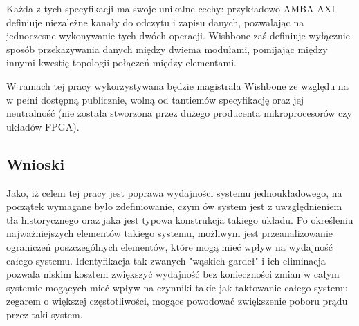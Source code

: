 Każda z tych specyfikacji ma swoje unikalne cechy: przykładowo AMBA AXI definiuje niezależne kanały do odczytu i zapisu danych, pozwalając na jednoczesne wykonywanie tych dwóch operacji. Wishbone zaś definiuje wyłącznie sposób przekazywania danych między dwiema modułami, pomijając między innymi kwestię topologii połączeń między elementami.

W ramach tej pracy wykorzystywana będzie magistrala Wishbone ze względu na w pełni dostępną publicznie, wolną od tantiemów specyfikację oraz jej neutralność (nie została stworzona przez dużego producenta mikroprocesorów czy układów FPGA).

\subsection{Wnioski}

Jako, iż celem tej pracy jest poprawa wydajności systemu jednoukładowego, na początek wymagane było zdefiniowanie, czym ów system jest z uwzględnieniem tła historycznego oraz jaka jest typowa konstrukcja takiego układu. Po określeniu najważniejszych elementów takiego systemu, możliwym jest przeanalizowanie ograniczeń poszczególnych elementów, które mogą mieć wpływ na wydajność całego systemu. Identyfikacja tak zwanych "wąskich gardeł" i ich eliminacja pozwala niskim kosztem zwiększyć wydajność bez konieczności zmian w całym systemie mogących mieć wpływ na czynniki takie jak taktowanie całego systemu zegarem o większej częstotliwości, mogące powodować zwiększenie poboru prądu przez taki system.
